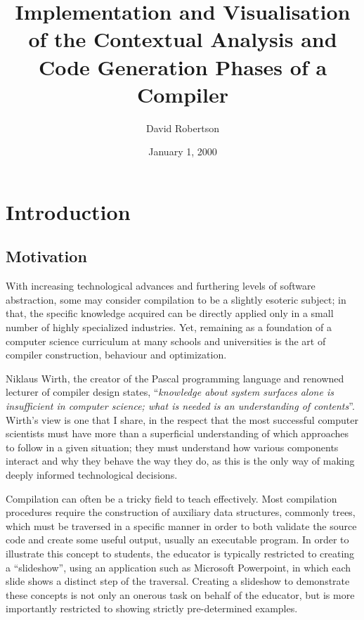 \documentclass{l4proj}
\begin{document}
\title{Implementation and Visualisation of the Contextual Analysis and Code Generation Phases of a Compiler}
\author{David Robertson}
\date{January 1, 2000}
\maketitle

\begin{abstract}

\end{abstract}

\educationalconsent
%
%
\tableofcontents

\chapter{Introduction}
\section{Motivation}
With increasing technological advances and furthering levels of software abstraction, some may consider compilation to be a slightly esoteric subject; in that, the specific knowledge acquired can be directly applied only in a small number of highly specialized industries. Yet, remaining as a foundation of a computer science curriculum at many schools and universities is the art of compiler construction, behaviour and optimization.

Niklaus Wirth, the creator of the Pascal programming language and renowned lecturer of compiler design states, ``\textit{knowledge about system surfaces alone is insufficient in computer science; what is needed is an understanding of contents}''. Wirth's view is one that I share, in the respect that the most successful computer scientists must have more than a superficial understanding of which approaches to follow in a given situation; they must understand how various components interact and why they behave the way they do, as this is the only way of making deeply informed technological decisions.

Compilation can often be a tricky field to teach effectively. Most compilation procedures require the construction of auxiliary data structures, commonly trees, which must be traversed in a specific manner in order to both validate the source code and create some useful output, usually an executable program. In order to illustrate this concept to students, the educator is typically restricted to creating a ``slideshow'', using an application such as Microsoft Powerpoint, in which each slide shows a distinct step of the traversal. Creating a slideshow to demonstrate these concepts is not only an onerous task on behalf of the educator, but is more importantly restricted to showing strictly pre-determined examples. 
\end{document}
